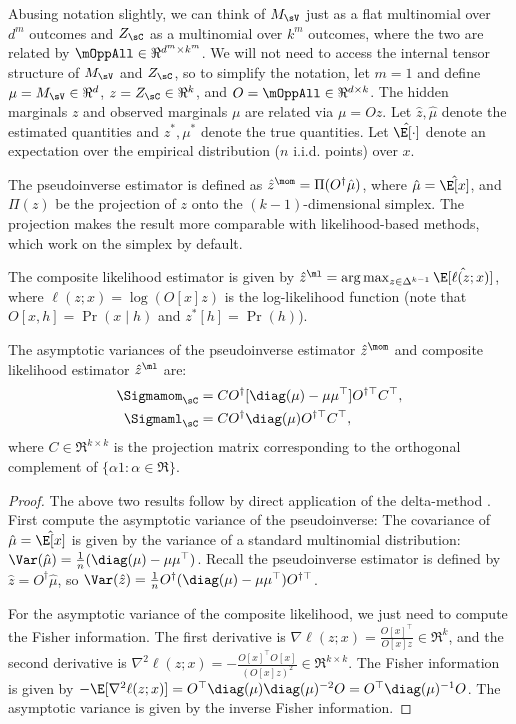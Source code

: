 Abusing notation slightly, we can think of $M_\sV$ just as a flat multinomial over $d^m$ outcomes
and $Z_\sC$ as a multinomial over $k^m$ outcomes, where the two are related by
$\mOppAll \in \Re^{d^m \times k^m}$.
We will not need to access the internal tensor structure of $M_\sV$ and $Z_\sC$,
so to simplify the notation, let $m=1$
and define $\mu = M_\sV \in \Re^d$,
$z = Z_\sC \in \Re^k$,
and $O = \mOppAll \in \Re^{d \times k}$.
The hidden marginals $z$ and observed marginals $\mu$ are related via $\mu = O z$.
Let $\hat z,\hat\mu$ denote the estimated quantities
and $z^*,\mu^*$ denote the true quantities.
Let $\hat\E[\cdot]$ denote an expectation over the empirical distribution ($n$ i.i.d. points) over $x$.

The pseudoinverse estimator is defined as $\hat z^\mom = \Pi(O^\dagger \hat\mu)$,
where $\hat\mu = \hat\E[x]$, and $\Pi(z)$ be the projection of $z$ onto the
$(k-1)$-dimensional simplex.  The projection makes the result more comparable with likelihood-based methods,
which work on the simplex by default.

The composite likelihood estimator is given by $\hat z^\ml = \arg\max_{z \in \Delta^{k-1}} \hat\E[\ell(z; x)]$,
where $\ell(z; x) = \log(O[x] z)$ is the log-likelihood function
(note that $O[x, h] = \Pr(x \mid h)$ and $z^*[h] = \Pr(h)$).

\begin{lemma}
  \label{lem:mom-pw-variance}
  The asymptotic variances of the pseudoinverse estimator $\hat z^\mom$
  and composite likelihood estimator $\hat z^\ml$ are:
  \begin{align*}
    \Sigmamom_\sC &= C O^\dagger [\diag(\mu) - \mu\mu^\top] O^{\dagger\top} C^\top, \\
    \Sigmaml_\sC &= C O^\dagger \diag(\mu) O^{\dagger\top} C^\top,
  \end{align*}
where $C \in \Re^{k \times k}$ is the projection matrix corresponding to the
orthogonal complement of $\{ \alpha 1 : \alpha \in \Re \}$.
\end{lemma}

\begin{proof}
  The above two results follow by direct application of the delta-method
  \cite{vaart98asymptotic}.
First compute the asymptotic variance of the pseudoinverse:
The covariance of $\hat\mu = \hat\E[x]$ is given by the variance of a standard multinomial distribution:
$\Var(\hat\mu) = \frac{1}{n}(\diag(\mu) - \mu\mu^\top)$.
Recall the pseudoinverse estimator is defined by $\hat z = O^\dagger \hat\mu$,
so $\Var(\hat z) = \frac{1}{n} O^\dagger (\diag(\mu) - \mu\mu^\top) O^{\dagger\top}$.

For the asymptotic variance of the composite likelihood,
we just need to compute the Fisher information.
The first derivative is
$\nabla\ell(z; x) = \frac{O[x]^\top}{O[x] z} \in \Re^k$,
and the second derivative is
$\nabla^2\ell(z; x) = -\frac{O[x]^\top O[x]}{(O[x] z)^2} \in \Re^{k \times k}$.
The Fisher information is given by
$-\E[\nabla^2\ell(z;x)] = O^\top \diag(\mu) \diag(\mu)^{-2} O = O^\top \diag(\mu)^{-1} O$.
The asymptotic variance is given by the inverse Fisher information.
\end{proof}

